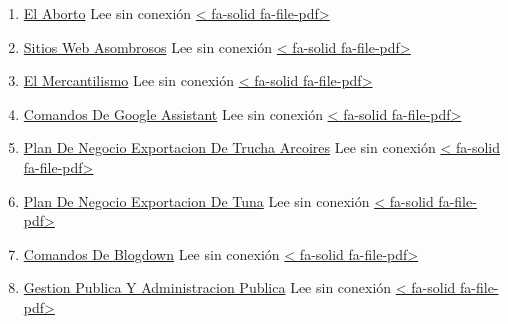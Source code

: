 \documentclass[
  jou,
  floatsintext,
  longtable,
  a4paper,
  nolmodern,
  notxfonts,
  notimes,
  colorlinks=true,linkcolor=blue,citecolor=blue,urlcolor=blue]{apa7}
\providecommand{\tightlist}{%
  \setlength{\itemsep}{0pt}\setlength{\parskip}{0pt}}
\begin{document}
\begin{enumerate}
\def\labelenumi{\arabic{enumi}.}
\tightlist
\item
  \href{https://achalmaedison.netlify.app/blog/posts/2015-05-14-el-aborto}{El
  Aborto} Lee sin conexión
  \href{https://achalmaedison.netlify.app/blog/posts/2015-05-14-el-aborto/index.pdf}{{{< fa-solid fa-file-pdf>}}}
\item
  \href{https://achalmaedison.netlify.app/blog/posts/2017-04-23-sitios-web-asombrosos}{Sitios
  Web Asombrosos} Lee sin conexión
  \href{https://achalmaedison.netlify.app/blog/posts/2017-04-23-sitios-web-asombrosos/index.pdf}{{{< fa-solid fa-file-pdf>}}}
\item
  \href{https://achalmaedison.netlify.app/blog/posts/2017-05-23-el-mercantilismo}{El
  Mercantilismo} Lee sin conexión
  \href{https://achalmaedison.netlify.app/blog/posts/2017-05-23-el-mercantilismo/index.pdf}{{{< fa-solid fa-file-pdf>}}}
\item
  \href{https://achalmaedison.netlify.app/blog/posts/2020-05-23-comandos-de-google-assistant}{Comandos
  De Google Assistant} Lee sin conexión
  \href{https://achalmaedison.netlify.app/blog/posts/2020-05-23-comandos-de-google-assistant/index.pdf}{{{< fa-solid fa-file-pdf>}}}
\item
  \href{https://achalmaedison.netlify.app/blog/posts/2020-09-15-plan-de-negocio-exportacion-de-trucha-arcoires}{Plan
  De Negocio Exportacion De Trucha Arcoires} Lee sin conexión
  \href{https://achalmaedison.netlify.app/blog/posts/2020-09-15-plan-de-negocio-exportacion-de-trucha-arcoires/index.pdf}{{{< fa-solid fa-file-pdf>}}}
\item
  \href{https://achalmaedison.netlify.app/blog/posts/2021-07-13-plan-de-negocio-exportacion-de-tuna}{Plan
  De Negocio Exportacion De Tuna} Lee sin conexión
  \href{https://achalmaedison.netlify.app/blog/posts/2021-07-13-plan-de-negocio-exportacion-de-tuna/index.pdf}{{{< fa-solid fa-file-pdf>}}}
\item
  \href{https://achalmaedison.netlify.app/blog/posts/2021-07-14-comandos-de-blogdown}{Comandos
  De Blogdown} Lee sin conexión
  \href{https://achalmaedison.netlify.app/blog/posts/2021-07-14-comandos-de-blogdown/index.pdf}{{{< fa-solid fa-file-pdf>}}}
\item
  \href{https://achalmaedison.netlify.app/blog/posts/2021-10-01-gestion-publica-y-administracion-publica}{Gestion
  Publica Y Administracion Publica} Lee sin conexión
  \href{https://achalmaedison.netlify.app/blog/posts/2021-10-01-gestion-publica-y-administracion-publica/index.pdf}{{{< fa-solid fa-file-pdf>}}}

\end{enumerate}
\end{document}

